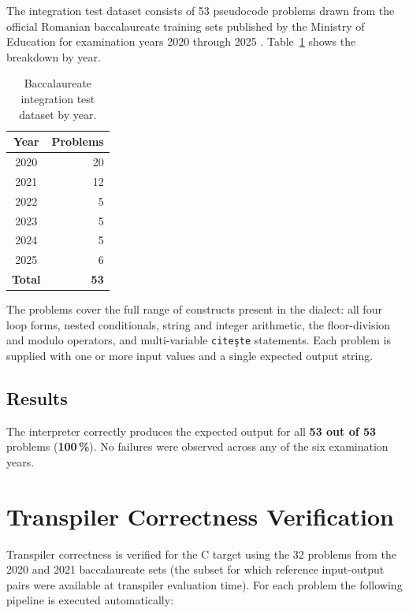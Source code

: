 The integration test dataset consists of 53 pseudocode problems drawn from
the official Romanian baccalaureate training sets published by the Ministry
of Education for examination years 2020 through 2025
\cite{romanian-curriculum}.
Table~\ref{tab:bac-dataset} shows the breakdown by year.

\begin{table}[h]
\centering
\small
\begin{tabular}{c r}
\hline
\textbf{Year} & \textbf{Problems} \\
\hline
2020 & 20 \\
2021 & 12 \\
2022 &  5 \\
2023 &  5 \\
2024 &  5 \\
2025 &  6 \\
\hline
\textbf{Total} & \textbf{53} \\
\hline
\end{tabular}
\caption{Baccalaureate integration test dataset by year.}
\label{tab:bac-dataset}
\end{table}

The problems cover the full range of constructs present in the dialect:
all four loop forms, nested conditionals, string and integer arithmetic,
the floor-division and modulo operators, and multi-variable
\texttt{citeşte} statements.  Each problem is supplied with one or more
input values and a single expected output string.

\subsection{Results}
\label{subsec:results}

The interpreter correctly produces the expected output for all
\textbf{53 out of 53} problems (\textbf{100\,\%}).  No failures were
observed across any of the six examination years.

\section{Transpiler Correctness Verification}
\label{sec:transpiler-eval}

Transpiler correctness is verified for the C target using the 32 problems
from the 2020 and 2021 baccalaureate sets (the subset for which reference
input-output pairs were available at transpiler evaluation time).  For each
problem the following pipeline is executed automatically:

